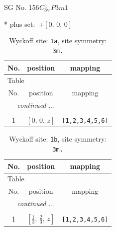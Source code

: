 \documentclass[fleqn,8pt]{jsarticle}
\begin{document}
\setcounter{MaxMatrixCols}{32}

\renewcommand{\tablename}{Table~}
\renewcommand{\figurename}{Figure~}
\begin{center}
\LARGE
SG No. 156\quad$C_{\rm 3v}^{1}$\quad$P3m1$\quad[ trigonal ]
\end{center}
* plus set:\,\,\,$+\left[ 0,\, 0,\, 0 \right]$
\renewcommand{\arraystretch}{1.2}
\begin{longtable}{ccc}
\caption{Wyckoff site: {\tt 1a}, site symmetry: {\tt 3m.}}
 \\
 \hline \hline
No. & position & mapping \\ \hline \endfirsthead

\multicolumn{2}{l}{\tablename\ \thetable{}} \\
 \hline \hline
No. & position & mapping \\ \hline \endhead

 \hline \hline
\multicolumn{2}{r}{\footnotesize\it continued ...} \\ \endfoot

 \hline \hline
\multicolumn{2}{r}{} \\ \endlastfoot

1 & $\left[ 0,\, 0,\, z \right]$ & {\tt [1,2,3,4,5,6]} \\
\end{longtable}
\renewcommand{\arraystretch}{1.2}
\begin{longtable}{ccc}
\caption{Wyckoff site: {\tt 1b}, site symmetry: {\tt 3m.}}
 \\
 \hline \hline
No. & position & mapping \\ \hline \endfirsthead

\multicolumn{2}{l}{\tablename\ \thetable{}} \\
 \hline \hline
No. & position & mapping \\ \hline \endhead

 \hline \hline
\multicolumn{2}{r}{\footnotesize\it continued ...} \\ \endfoot

 \hline \hline
\multicolumn{2}{r}{} \\ \endlastfoot

1 & $\left[ \frac{1}{3},\, \frac{2}{3},\, z \right]$ & {\tt [1,2,3,4,5,6]} \\
\end{longtable}
\renewcommand{\arraystretch}{1.2}
\end{document}
